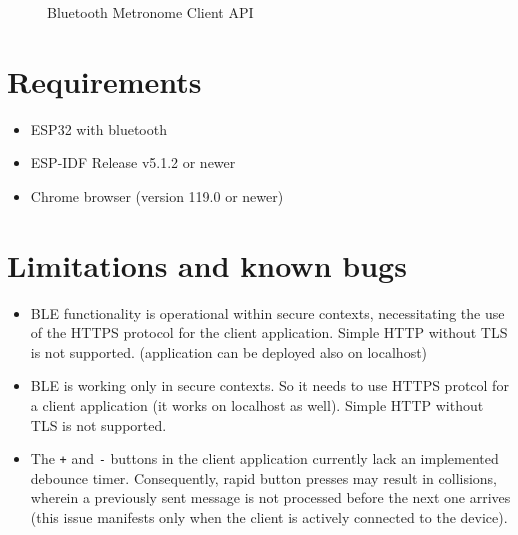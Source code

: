 \documentclass[a4paper, 11pt, a4paper]{article}
\begin{document}
\begin{figure}[ht]
    \begin{center}
    \end{center}
    \caption{Bluetooth Metronome Client API}
    \label{figure:api}
\end{figure}

\section{Requirements}

\begin{itemize}
    \item ESP32 with bluetooth
    \item ESP-IDF Release v5.1.2 or newer
    \item Chrome browser (version 119.0 or newer)
\end{itemize}


\section{Limitations and known bugs}

\begin{itemize}
    \item BLE functionality is operational within secure contexts, necessitating the use of the HTTPS protocol for the client application. Simple HTTP without TLS is not supported. (application can be deployed also on localhost)
    \item BLE is working only in secure contexts. So it needs to use HTTPS protcol for a client application (it works on localhost as well). Simple HTTP without TLS is not supported.
    \item The \verb|+| and \verb|-| buttons in the client application currently lack an implemented debounce timer. Consequently, rapid button presses may result in collisions, wherein a previously sent message is not processed before the next one arrives (this issue manifests only when the client is actively connected to the device). 
\end{itemize}
\end{document}
